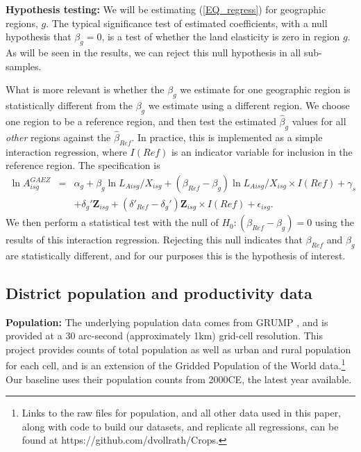 \documentclass[11pt]{article}
\begin{document}
\vspace{.5cm}\noindent\textbf{Hypothesis testing:} We will be estimating (\ref{EQ_regress}) for geographic regions, $g$. The typical significance test of estimated coefficients, with a null hypothesis that $\beta_g=0$, is a test of whether the land elasticity is zero in region $g$. As will be seen in the results, we can reject this null hypothesis in all sub-samples.

What is more relevant is whether the $\beta_g$ we estimate for one geographic region is statistically different from the $\beta_g$ we estimate using a different region. We choose one region to be a reference region, and then test the estimated $\hat{\beta}_g$ values for all \textit{other} regions against the $\hat{\beta}_{Ref}$. In practice, this is implemented as a simple interaction regression, where $I(Ref)$ is an indicator variable for inclusion in the reference region. The specification is
\begin{eqnarray}
    \ln A^{GAEZ}_{isg} &=& \alpha_g + \beta_g \ln L_{Aisg}/X_{isg} + (\beta_{Ref} - \beta_g) \ln L_{Aisg}/X_{isg} \times I(Ref) + \gamma_{s} \\ \nonumber
     && + \delta_g' \mathbf{Z}_{isg} + (\delta'_{Ref} - \delta_g') \mathbf{Z}_{isg} \times I(Ref) + \epsilon_{isg}. \label{EQ_interaction}
\end{eqnarray}
We then perform a statistical test with the null of $H_0: (\beta_{Ref} - \beta_g) = 0$ using the results of this interaction regression. Rejecting this null indicates that $\beta_{Ref}$ and $\beta_g$ are statistically different, and for our purposes this is the hypothesis of interest.

\subsection{District population and productivity data}

\noindent\textbf{Population:} The underlying population data comes from GRUMP \citep{grump2011}, and is provided at a 30 arc-second (approximately 1km) grid-cell resolution. This project provides counts of total population as well as urban and rural population for each cell, and is an extension of the Gridded Population of the World data.\footnote{Links to the raw files for population, and all other data used in this paper, along with code to build our datasets, and replicate all regressions, can be found at https://github.com/dvollrath/Crops.} Our baseline uses their population counts from 2000CE, the latest year available.
\end{document}
